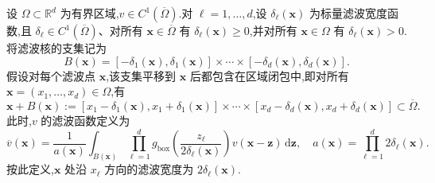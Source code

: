 \begin{note}[滤波宽度可变的方框滤波器]
\label{note:variable-width-box-filter}
设 $\Omega\subset\mathbb{R}^d$ 为有界区域,$v\in C^1(\overline\Omega)$.对 $\ell=1,\ldots,d$,设 $\delta_\ell(\bm{x})$ 为标量滤波宽度函数,且 $\delta_\ell\in C^1(\overline\Omega)$、对所有 $\bm{x}\in\overline\Omega$ 有 $\delta_\ell(\bm{x})\ge0$,并对所有 $\bm{x}\in\Omega$ 有 $\delta_\ell(\bm{x})>0$.将滤波核的支集记为
\[
 B(\bm{x})=
 [-\delta_1(\bm{x}),\delta_1(\bm{x})]\times\cdots\times
 [-\delta_d(\bm{x}),\delta_d(\bm{x})].
\]
假设对每个滤波点 $\bm{x}$,该支集平移到 $\bm{x}$ 后都包含在区域闭包中,即对所有 $\bm{x}=(x_1,\ldots,x_d)\in\Omega$,有
\[
 \bm{x}+B(\bm{x})
 :=[x_1-\delta_1(\bm{x}),x_1+\delta_1(\bm{x})]\times\cdots\times
   [x_d-\delta_d(\bm{x}),x_d+\delta_d(\bm{x})]
 \subset\overline\Omega.
\]
此时,$v$ 的滤波函数定义为
\begin{equation}\label{eq:variable-width-box-filter}
 \overline{v}(\bm{x})
  =\frac{1}{a(\bm{x})}
    \int_{B(\bm{x})}
      \prod_{\ell=1}^d
       g_{\mathrm{box}}\!\left(\frac{z_\ell}{2\delta_\ell(\bm{x})}\right)
      v(\bm{x}-\bm{z})\,\mathrm{d}\bm{z},
  \quad
 a(\bm{x})=\prod_{\ell=1}^d2\delta_\ell(\bm{x}).
\end{equation}
按此定义,$\bm{x}$ 处沿 $x_\ell$ 方向的滤波宽度为 $2\delta_\ell(\bm{x})$.
\end{note}

